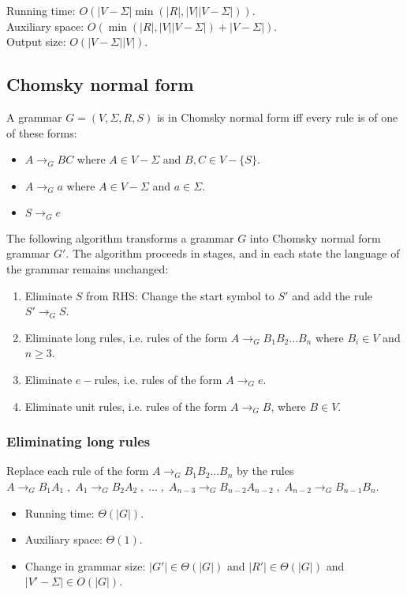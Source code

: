 Running time: $O(|V-\Sigma|\min(|R|, |V||V-\Sigma|))$.\\
Auxiliary space: $O(\min(|R|, |V||V-\Sigma|) + |V-\Sigma|)$.\\
Output size: $O(|V-\Sigma||V|)$.

\subsection{Chomsky normal form}

\begin{definition}
A grammar $G = (V, \Sigma, R, S)$ is in Chomsky normal form iff every rule is of one of these forms:
\begin{itemize}
\item $A \rightarrow_G BC$ where $A \in V - \Sigma$ and $B, C \in V - \{S\}$.
\item $A \rightarrow_G a$ where $A \in V - \Sigma$ and $a \in \Sigma$.
\item $S \rightarrow_G e$
\end{itemize}
\end{definition}

The following algorithm transforms a grammar $G$ into Chomsky normal form grammar $G'$.
The algorithm proceeds in stages, and in each state the language of the grammar remains unchanged:
\begin{enumerate}
\item Eliminate $S$ from RHS: Change the start symbol to $S'$ and add the rule $S' \rightarrow_G S$.
\item Eliminate long rules, i.e. rules of the form $A \rightarrow_G B_1B_2\ldots B_n$ where $B_i \in V$ and $n \ge 3$.
\item Eliminate $e-$rules, i.e. rules of the form $A \rightarrow_G e$.
\item Eliminate unit rules, i.e. rules of the form $A \rightarrow_G B$, where $B \in V$.
\end{enumerate}

\subsubsection{Eliminating long rules}

Replace each rule of the form $A \rightarrow_G B_1B_2\ldots B_n$ by the rules
$A \rightarrow_G B_1A_1 \;,\; A_1 \rightarrow_G B_2A_2 \;,\; \ldots \;,\;
A_{n-3} \rightarrow_G B_{n-2}A_{n-2} \;,\; A_{n-2} \rightarrow_G B_{n-1}B_n$.

\begin{itemize}
\item Running time: $\Theta(|G|)$.
\item Auxiliary space: $\Theta(1)$.
\item Change in grammar size: $|G'| \in \Theta(|G|)$ and $|R'| \in \Theta(|G|)$ and $|V'-\Sigma| \in O(|G|)$.
\end{itemize}

